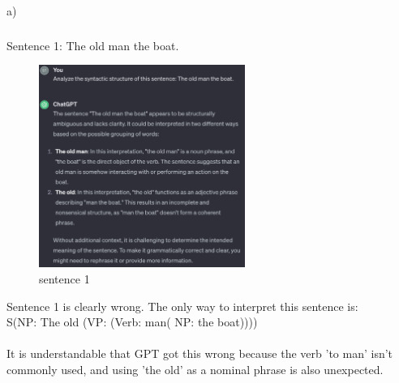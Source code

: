 \documentclass{article}
\begin{document}
\subsection{}
\section{} %
\section{} %
\section{} %
\subsection{}

a) \\

\subsubsection{}	%
Sentence 1: The old man the boat. \\
\begin{figure}[H]
  \centering
  \includegraphics[width=0.6\textwidth]{4.1a1.png} 
  \caption{sentence 1}
\end{figure}


Sentence 1 is clearly wrong. The only way to interpret this sentence is: \\
S(NP: The old (VP: (Verb: man( NP: the boat))))
\\ \\
It is understandable that GPT got this wrong because the verb 'to man' isn't commonly used, and using 'the old' as a nominal phrase is also unexpected. \\
\end{document}
